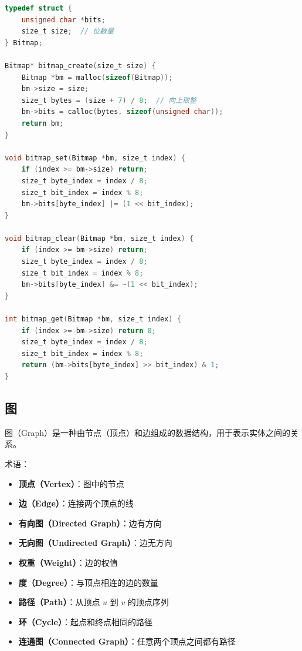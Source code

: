 \begin{lstlisting}[language=C, caption={位图实现}]
typedef struct {
    unsigned char *bits;
    size_t size;  // 位数量
} Bitmap;

Bitmap* bitmap_create(size_t size) {
    Bitmap *bm = malloc(sizeof(Bitmap));
    bm->size = size;
    size_t bytes = (size + 7) / 8;  // 向上取整
    bm->bits = calloc(bytes, sizeof(unsigned char));
    return bm;
}

void bitmap_set(Bitmap *bm, size_t index) {
    if (index >= bm->size) return;
    size_t byte_index = index / 8;
    size_t bit_index = index % 8;
    bm->bits[byte_index] |= (1 << bit_index);
}

void bitmap_clear(Bitmap *bm, size_t index) {
    if (index >= bm->size) return;
    size_t byte_index = index / 8;
    size_t bit_index = index % 8;
    bm->bits[byte_index] &= ~(1 << bit_index);
}

int bitmap_get(Bitmap *bm, size_t index) {
    if (index >= bm->size) return 0;
    size_t byte_index = index / 8;
    size_t bit_index = index % 8;
    return (bm->bits[byte_index] >> bit_index) & 1;
}
\end{lstlisting}

\subsection{图}


图（Graph）是一种由节点（顶点）和边组成的数据结构，用于表示实体之间的关系。

术语：
\begin{itemize}
  \item \textbf{顶点（Vertex）}：图中的节点
  \item \textbf{边（Edge）}：连接两个顶点的线
  \item \textbf{有向图（Directed Graph）}：边有方向
  \item \textbf{无向图（Undirected Graph）}：边无方向
  \item \textbf{权重（Weight）}：边的权值
  \item \textbf{度（Degree）}：与顶点相连的边的数量
  \item \textbf{路径（Path）}：从顶点 $u$ 到 $v$ 的顶点序列
  \item \textbf{环（Cycle）}：起点和终点相同的路径
  \item \textbf{连通图（Connected Graph）}：任意两个顶点之间都有路径
\end{itemize}

